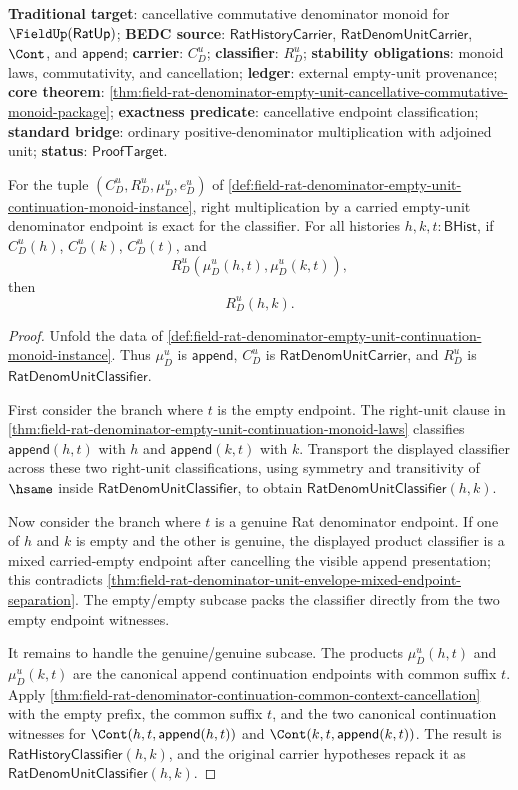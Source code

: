 \textbf{Traditional target}: cancellative commutative denominator monoid for
$\FieldUp(\mathsf{RatUp})$; \textbf{BEDC source}:
$\mathsf{RatHistoryCarrier}$, $\mathsf{RatDenomUnitCarrier}$, $\Cont$, and
$\mathsf{append}$; \textbf{carrier}: $C_D^u$; \textbf{classifier}: $R_D^u$;
\textbf{stability obligations}: monoid laws, commutativity, and cancellation;
\textbf{ledger}: external empty-unit provenance; \textbf{core theorem}:
\autoref{thm:field-rat-denominator-empty-unit-cancellative-commutative-monoid-package};
\textbf{exactness predicate}: cancellative endpoint classification;
\textbf{standard bridge}: ordinary positive-denominator multiplication with
adjoined unit; \textbf{status}: $\mathsf{ProofTarget}$.

\begin{theorem}
\label{thm:field-rat-denominator-empty-unit-right-cancellation}
For the tuple $(C_D^u,R_D^u,\mu_D^u,e_D^u)$ of
\autoref{def:field-rat-denominator-empty-unit-continuation-monoid-instance},
right multiplication by a carried empty-unit denominator endpoint is exact for
the classifier. For all histories $h,k,t:\mathsf{BHist}$, if $C_D^u(h)$,
$C_D^u(k)$, $C_D^u(t)$, and
$$
R_D^u(\mu_D^u(h,t),\mu_D^u(k,t)),
$$
then
$$
R_D^u(h,k).
$$
\end{theorem}
\begin{proof}
Unfold the data of
\autoref{def:field-rat-denominator-empty-unit-continuation-monoid-instance}.
Thus $\mu_D^u$ is $\mathsf{append}$, $C_D^u$ is
$\mathsf{RatDenomUnitCarrier}$, and $R_D^u$ is
$\mathsf{RatDenomUnitClassifier}$.

First consider the branch where $t$ is the empty endpoint. The right-unit
clause in
\autoref{thm:field-rat-denominator-empty-unit-continuation-monoid-laws}
classifies $\mathsf{append}(h,t)$ with $h$ and $\mathsf{append}(k,t)$ with
$k$. Transport the displayed classifier across these two right-unit
classifications, using symmetry and transitivity of $\hsame$ inside
$\mathsf{RatDenomUnitClassifier}$, to obtain
$\mathsf{RatDenomUnitClassifier}(h,k)$.

Now consider the branch where $t$ is a genuine Rat denominator endpoint. If one
of $h$ and $k$ is empty and the other is genuine, the displayed product
classifier is a mixed carried-empty endpoint after cancelling the visible
append presentation; this contradicts
\autoref{thm:field-rat-denominator-unit-envelope-mixed-endpoint-separation}.
The empty/empty subcase packs the classifier directly from the two empty
endpoint witnesses.

It remains to handle the genuine/genuine subcase. The products
$\mu_D^u(h,t)$ and $\mu_D^u(k,t)$ are the canonical append continuation
endpoints with common suffix $t$. Apply
\autoref{thm:field-rat-denominator-continuation-common-context-cancellation}
with the empty prefix, the common suffix $t$, and the two canonical
continuation witnesses for $\Cont(h,t,\mathsf{append}(h,t))$ and
$\Cont(k,t,\mathsf{append}(k,t))$. The result is
$\mathsf{RatHistoryClassifier}(h,k)$, and the original carrier hypotheses
repack it as $\mathsf{RatDenomUnitClassifier}(h,k)$.
\end{proof}

